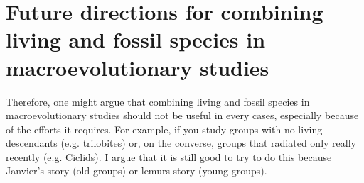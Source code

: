 
\section{Future directions for combining living and fossil species in macroevolutionary studies}

Therefore, one might argue that combining living and fossil species in macroevolutionary studies should not be useful in every cases, especially because of the efforts it requires.
For example, if you study groups with no living descendants (e.g. trilobites) or, on the converse, groups that radiated only really recently (e.g. Ciclids).
I argue that it is still good to try to do this because
Janvier's story (old groups) or lemurs story (young groups).

